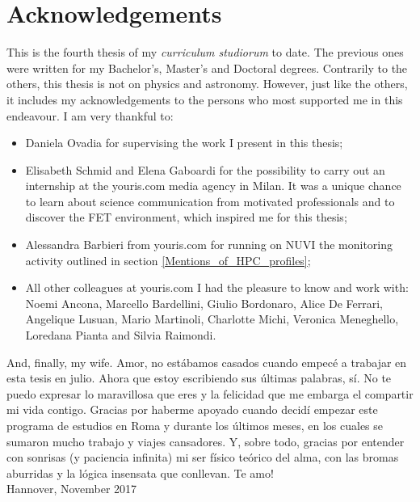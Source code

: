 \chapter*{Acknowledgements}
This is the fourth thesis of my \textit{curriculum studiorum} to date. The previous ones were written for my Bachelor's, Master's and Doctoral degrees. Contrarily to the others, this thesis is not on physics and astronomy. However, just like the others, it includes my acknowledgements to the persons who most supported me in this endeavour. I am very thankful to:
  
\begin{itemize}
 \item Daniela Ovadia for supervising the work I present in this thesis;
 \item Elisabeth Schmid and Elena Gaboardi for the possibility to carry out an internship at the youris.com media agency in Milan. It was a unique chance to learn about science communication from motivated professionals and to discover the FET environment, which inspired me for this thesis; 
 \item Alessandra Barbieri from youris.com for running on NUVI the monitoring activity outlined in section \ref{Mentions_of_HPC_profiles};
 \item All other colleagues at youris.com I had the pleasure to know and work with: Noemi Ancona, Marcello Bardellini, Giulio Bordonaro, Alice De Ferrari, Angelique Lusuan, Mario Martinoli, Charlotte Michi, Veronica Meneghello, Loredana Pianta and Silvia Raimondi.
\end{itemize}

\noindent
And, finally, my wife. Amor, no est\'abamos casados cuando empec\'e a trabajar en esta tesis  en julio. Ahora que estoy escribiendo sus \'ultimas palabras, s\'i. No te puedo expresar lo maravillosa que eres y la felicidad que me embarga el compartir mi vida contigo. Gracias por haberme apoyado cuando decid\'i empezar este programa de estudios en Roma y durante los \'ultimos meses, en los cuales se sumaron mucho trabajo y viajes cansadores. Y, sobre todo, gracias por entender con sonrisas (y paciencia infinita) mi ser f\'isico te\'orico del alma, con las bromas aburridas y la l\'ogica insensata que conllevan. Te amo! \\

\noindent
Hannover, November 2017